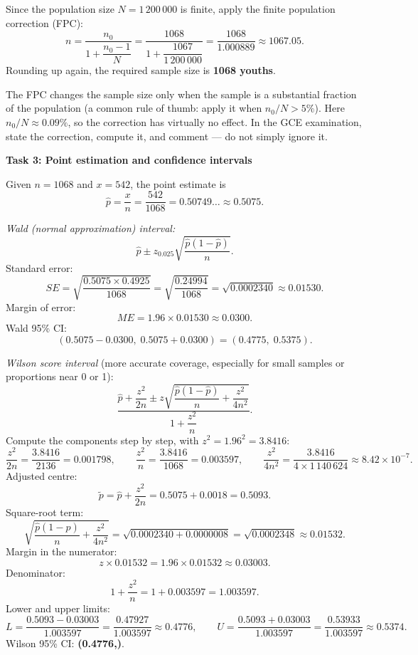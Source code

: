 \documentclass[11pt]{article}
\newcommand{\cle}[1]{{\popxbold\color{popdark}#1}}
\begin{document}
Since the population size $N = 1\,200\,000$ is finite, apply the \cle{finite population correction (FPC)}:
\[
n = \frac{n_0}{1 + \dfrac{n_0-1}{N}}
  = \frac{1068}{1 + \dfrac{1067}{1\,200\,000}}
  = \frac{1068}{1.000889}
  \approx 1067.05.
\]
Rounding up again, the required sample size is \textbf{1068 youths}.

\begin{attention}
The FPC changes the sample size only when the sample is a substantial fraction of the population (a common rule of thumb: apply it when $n_0/N > 5\%$). Here $n_0/N \approx 0.09\%$, so the correction has virtually no effect. In the GCE examination, state the correction, compute it, and comment --- do not simply ignore it.
\end{attention}

\textbf{Task 3: Point estimation and confidence intervals}

Given $n=1068$ and $x=542$, the point estimate is
\[
\hat{p} = \frac{x}{n} = \frac{542}{1068} = 0.50749\ldots \approx 0.5075.
\]

\emph{Wald (normal approximation) interval:}
\[
\hat{p} \pm z_{0.025}\sqrt{\frac{\hat{p}(1-\hat{p})}{n}}.
\]
Standard error:
\[
SE = \sqrt{\frac{0.5075 \times 0.4925}{1068}}
    = \sqrt{\frac{0.24994}{1068}}
    = \sqrt{0.0002340}
    \approx 0.01530.
\]
Margin of error:
\[
ME = 1.96 \times 0.01530 \approx 0.0300.
\]
Wald 95\% CI:
\[
(0.5075 - 0.0300,\; 0.5075 + 0.0300) = (0.4775,\; 0.5375).
\]

\emph{Wilson score interval} (more accurate coverage, especially for small samples or proportions near 0 or 1):
\[
\frac{\hat{p} + \dfrac{z^2}{2n} \pm z \sqrt{\dfrac{\hat{p}(1-\hat{p})}{n} + \dfrac{z^2}{4n^2}}}{1 + \dfrac{z^2}{n}}.
\]
Compute the components step by step, with $z^2 = 1.96^2 = 3.8416$:
\[
\frac{z^2}{2n} = \frac{3.8416}{2136} = 0.001798, \qquad
\frac{z^2}{n} = \frac{3.8416}{1068} = 0.003597, \qquad
\frac{z^2}{4n^2} = \frac{3.8416}{4 \times 1\,140\,624} \approx 8.42 \times 10^{-7}.
\]
Adjusted centre:
\[
\tilde{p} = \hat{p} + \frac{z^2}{2n} = 0.5075 + 0.0018 = 0.5093.
\]
Square-root term:
\[
\sqrt{\frac{\hat{p}(1-\hat{p})}{n} + \frac{z^2}{4n^2}}
= \sqrt{0.0002340 + 0.0000008}
= \sqrt{0.0002348}
\approx 0.01532.
\]
Margin in the numerator:
\[
z \times 0.01532 = 1.96 \times 0.01532 \approx 0.03003.
\]
Denominator:
\[
1 + \frac{z^2}{n} = 1 + 0.003597 = 1.003597.
\]
Lower and upper limits:
\[
L = \frac{0.5093 - 0.03003}{1.003597} = \frac{0.47927}{1.003597} \approx 0.4776,
\qquad
U = \frac{0.5093 + 0.03003}{1.003597} = \frac{0.53933}{1.003597} \approx 0.5374.
\]
Wilson 95\% CI: \textbf{(0.4776,)}.
\end{document}
